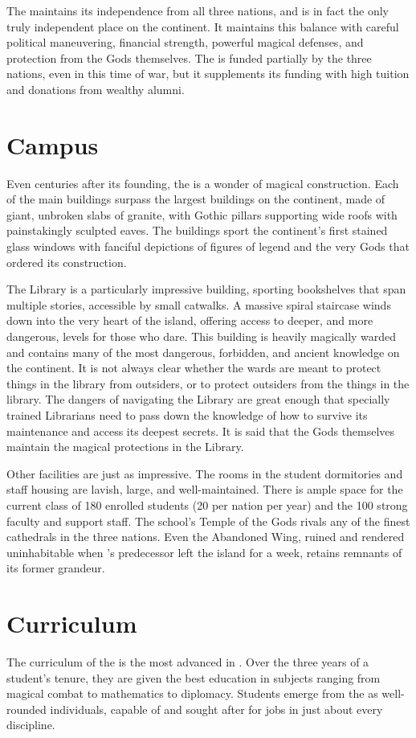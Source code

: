 \documentclass[blue]{GL2020}
\begin{document}
The \pSc{} maintains its independence from all three nations, and is in fact the only truly independent place on the continent. It maintains this balance with careful political maneuvering, financial strength, powerful magical defenses, and protection from the Gods themselves. The \pSc{} is funded partially by the three nations, even in this time of war, but it supplements its funding with high tuition and donations from wealthy alumni.

\section*{Campus}
Even centuries after its founding, the \pSc{} is a wonder of magical construction. Each of the main buildings surpass the largest buildings on the continent, made of giant, unbroken slabs of granite, with Gothic pillars supporting wide roofs with painstakingly sculpted eaves. The buildings sport the continent’s first stained glass windows with fanciful depictions of figures of legend and the very Gods that ordered its construction. 

The Library is a particularly impressive building, sporting bookshelves that span multiple stories, accessible by small catwalks. A massive spiral staircase winds down into the very heart of the island, offering access to deeper, and more dangerous, levels for those who dare. This building is heavily magically warded and contains many of the most dangerous, forbidden, and ancient knowledge on the continent. It is not always clear whether the wards are meant to protect things in the library from outsiders, or to protect outsiders from the things in the library. The dangers of navigating the Library are great enough that specially trained Librarians need to pass down the knowledge of how to survive its maintenance and access its deepest secrets. It is said that the Gods themselves maintain the magical protections in the Library.

Other facilities are just as impressive. The rooms in the student dormitories and staff housing are lavish, large, and well-maintained. There is ample space for the current class of 180 enrolled students (20 per nation per year) and the 100 strong faculty and support staff. The school’s Temple of the Gods rivals any of the finest cathedrals in the three nations. Even the Abandoned Wing, ruined and rendered uninhabitable when \cPrincipal{}'s predecessor left the island for a week, retains remnants of its former grandeur. 

\section*{Curriculum}
The curriculum of the \pSc{} is the most advanced in \pEarth{}. Over the three years of a student’s tenure, they are given the best education in subjects ranging from magical combat to mathematics to diplomacy. Students emerge from the \pSchool{} as well-rounded individuals, capable of and sought after for jobs in just about every discipline. 
\end{document}
